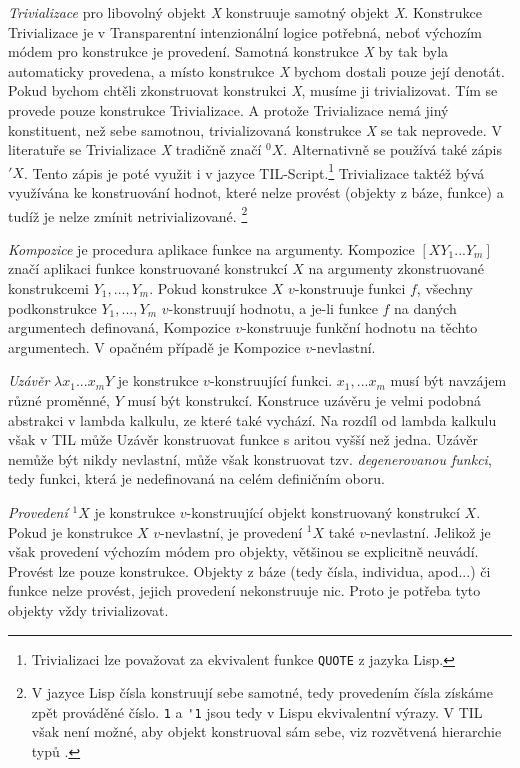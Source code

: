 \lstset{language=Lisp}
\textit{Trivializace} pro libovolný objekt \textit{X} konstruuje samotný objekt \textit{X}.
Konstrukce Trivializace je v Transparentní intenzionální logice potřebná, neboť výchozím módem pro
konstrukce je provedení. Samotná konstrukce \textit{X} by tak byla automaticky provedena, a místo
konstrukce \textit{X} bychom dostali pouze její denotát. Pokud bychom chtěli zkonstruovat konstrukci
\textit{X}, musíme ji trivializovat. Tím se provede pouze konstrukce Trivializace. A protože
Trivializace nemá jiný konstituent, než sebe samotnou, trivializovaná konstrukce \textit{X} se tak
neprovede. V literatuře se Trivializace \textit{X} tradičně značí ${}^0X$. Alternativně se
používá také zápis $'X$. Tento zápis je poté využit i v jazyce TIL-Script.\footnote{Trivializaci lze
považovat za ekvivalent funkce \lstinline{QUOTE} z jazyka Lisp.} Trivializace taktéž bývá využívána
ke konstruování hodnot, které nelze provést (objekty z báze, funkce) a tudíž je nelze zmínit
netrivializované.
\footnote{
    V jazyce Lisp čísla konstruují sebe samotné, tedy provedením čísla získáme zpět prováděné
    číslo. \lstinline{1} a \lstinline{'1} jsou tedy v Lispu ekvivalentní výrazy. V TIL však není
    možné, aby objekt konstruoval sám sebe, viz rozvětvená hierarchie typů .
}
\lstset{language=Tilscript}

\textit{Kompozice} je procedura aplikace funkce na argumenty. Kompozice $[X Y_1...Y_m]$ značí
aplikaci funkce konstruované konstrukcí $X$ na argumenty zkonstruované konstrukcemi $Y_1,...,Y_m$.
Pokud konstrukce $X$ $v$-konstruuje funkci $f$, všechny podkonstrukce $Y_1,...,Y_m$ $v$-konstruují
hodnotu, a je-li funkce $f$ na daných argumentech definovaná, Kompozice $v$-konstruuje funkční
hodnotu na těchto argumentech. V opačném případě je Kompozice $v$-nevlastní.

\textit{Uzávěr} $\lambda x_1...x_m Y$ je konstrukce $v$-konstruující funkci. $x_1,...x_m$ musí
být navzájem různé proměnné, $Y$ musí být konstrukcí. Konstruce uzávěru je velmi podobná abstrakci
v lambda kalkulu, ze které také vychází. Na rozdíl od lambda kalkulu však v TIL může Uzávěr
konstruovat funkce s aritou vyšší než jedna. Uzávěr nemůže být nikdy nevlastní, může však
konstruovat tzv. \textit{degenerovanou funkci}, tedy funkci, která je nedefinovaná na celém
definičním oboru.

\textit{Provedení} ${}^1X$ je konstrukce $v$-konstruující objekt konstruovaný konstrukcí $X$.
Pokud je konstrukce $X$ $v$-nevlastní, je provedení ${}^1X$ také $v$-nevlastní. Jelikož je však
provedení výchozím módem pro objekty, většinou se explicitně neuvádí. Provést lze pouze konstrukce.
Objekty z báze (tedy čísla, individua, apod...) či funkce nelze provést, jejich provedení
nekonstruuje nic. Proto je potřeba tyto objekty vždy trivializovat.

